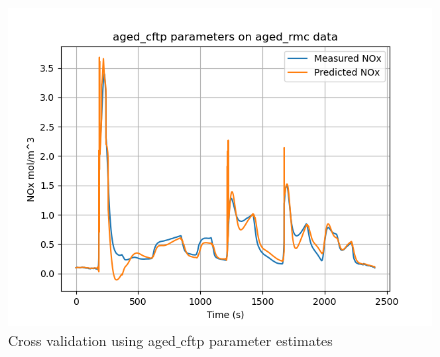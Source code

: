 \begin{figure}[H]
\begin{minipage}{0.33\textwidth}
                \includegraphics[width = \textwidth]{./figs/figs_new_mdl/aged_cftp_aged_rmc.png}
        \end{minipage}
        \caption{Cross validation using aged$\_$cftp parameter estimates}
\end{figure}

